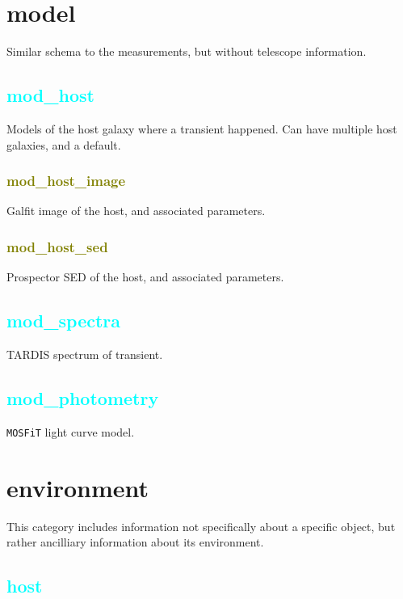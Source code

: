 \documentclass[tighten]{aastex631}
\newcommand{\property}[1]{\textcolor{cyan}{#1}}
\newcommand{\subproperty}[1]{\textcolor{olive}{#1}}
\begin{document}
\section{model} \label{sec:model}

Similar schema to the measurements, but without telescope information.

\subsection{\property{mod\_host}} \label{subsec:mod_host}

Models of the host galaxy where a transient happened. Can have multiple host galaxies, and a default.

\subsubsection{\subproperty{mod\_host\_image}} \label{subsec:mod_host_image}

Galfit image of the host, and associated parameters.

\subsubsection{\subproperty{mod\_host\_sed}} \label{subsec:mod_host_sed}

Prospector SED of the host, and associated parameters.

\subsection{\property{mod\_spectra}} \label{subsec:mod_spectra}

TARDIS spectrum of transient.

\subsection{\property{mod\_photometry}} \label{subsec:mod_photometry}

{\tt MOSFiT} light curve model.

\section{environment} \label{sec:environment}

This category includes information not specifically about a specific object, but rather ancilliary information about its environment.

\subsection{\property{host}} \label{sec:host}
\end{document}
